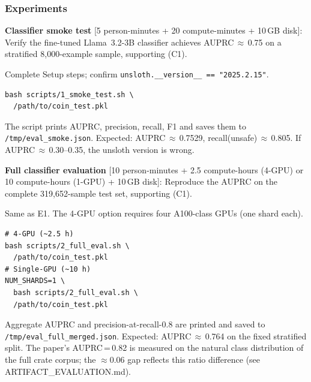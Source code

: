 \documentclass[nonacm,sigconf]{acmart}
\begin{document}
\subsubsection{Experiments}

\begin{compactitem}
\item[(E1):]
  \textbf{Classifier smoke test}
  [5 person-minutes + 20 compute-minutes + 10\,GB disk]:
  Verify the fine-tuned Llama~3.2-3B classifier achieves
  AUPRC\,$\approx$\,0.75 on a stratified 8,000-example sample,
  supporting (C1).

  \begin{asparadesc}
  \item[Preparation:] Complete Setup steps; confirm
        \texttt{unsloth.\_\_version\_\_ == "2025.2.15"}.
  \item[Execution:]
\begin{verbatim}
bash scripts/1_smoke_test.sh \
  /path/to/coin_test.pkl
\end{verbatim}
  \item[Results:] The script prints AUPRC, precision, recall, F1 and
        saves them to \texttt{/tmp/eval\_smoke.json}.
        Expected: AUPRC\,$\approx$\,0.7529,
        recall(unsafe)\,$\approx$\,0.805.
        If AUPRC\,$\approx$\,0.30--0.35, the unsloth version is wrong.
  \end{asparadesc}

\item[(E2):]
  \textbf{Full classifier evaluation}
  [10 person-minutes + 2.5 compute-hours (4-GPU) or 10 compute-hours
  (1-GPU) + 10\,GB disk]:
  Reproduce the AUPRC on the complete 319,652-sample test set,
  supporting (C1).

  \begin{asparadesc}
  \item[Preparation:] Same as E1. The 4-GPU option requires four
        A100-class GPUs (one shard each).
  \item[Execution:]
\begin{verbatim}
# 4-GPU (~2.5 h)
bash scripts/2_full_eval.sh \
  /path/to/coin_test.pkl
# Single-GPU (~10 h)
NUM_SHARDS=1 \
  bash scripts/2_full_eval.sh \
  /path/to/coin_test.pkl
\end{verbatim}
  \item[Results:] Aggregate AUPRC and precision-at-recall-0.8 are
        printed and saved to \texttt{/tmp/eval\_full\_merged.json}.
        Expected: AUPRC\,$\approx$\,0.764 on the fixed stratified split.
        The paper's AUPRC\,=\,0.82 is measured on the natural class
        distribution of the full crate corpus; the $\approx$0.06 gap
        reflects this ratio difference (see ARTIFACT\_EVALUATION.md).
  \end{asparadesc}


\end{compactitem}
\end{document}
